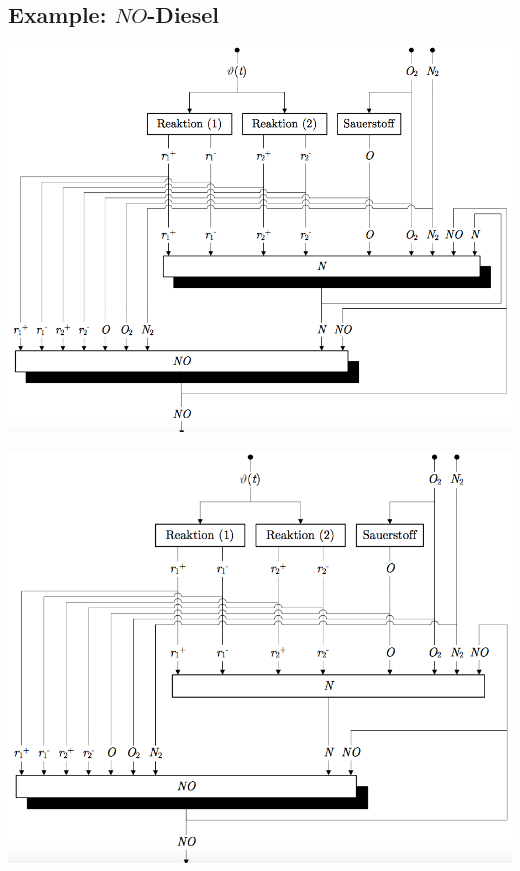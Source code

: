 \documentclass[10pt,a4paper]{scrartcl}
\begin{document}
\begin{multicols*}{3}
\subsection{Example: $NO$-Diesel}
\begin{minipage}{0.5\columnwidth}
		\begin{center}\includegraphics[width=\columnwidth]{chem_1.png}\end{center}
        \end{minipage}
		\begin{minipage}{0.5\columnwidth}
		\begin{center}\includegraphics[width=\columnwidth]{chem_2.png}\end{center}

\end{minipage}
\end{multicols*}
\end{document}
